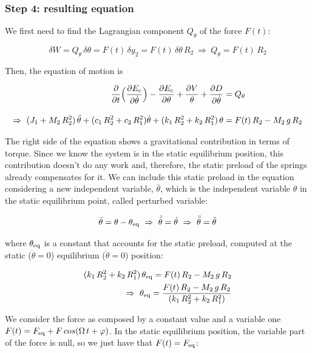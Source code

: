 \documentclass[a4paper,12pt,oneside]{article}
\begin{document}
\subsubsection*{Step 4: resulting equation}

We first need to find the Lagrangian component $ Q_\theta $ of the force $ F(t) $:

\[
	\delta W = Q_\theta \, \delta \theta =
		F(t) \, \delta y_2 = F(t) \, \delta \theta \, R_2 ~ \Rightarrow ~
		Q_\theta = F(t) \, R_2
\]

Then, the equation of motion is

\[ \begin{split}
	\frac{\partial}{\partial t}
		\Bigl(\frac{\partial E_c}{\partial \dot{\theta}}\Bigr) -
		\frac{\partial E_c}{\partial \theta} +
		\frac{\partial V}{\theta} +
		\frac{\partial D}{\partial \dot{\theta}} & = Q_\theta \\[10pt]
	\Rightarrow ~ (J_1 + M_2 \, R_2^2) \,	\ddot{\theta} +
		(c_1 \, R_2^2 + c_2 \, R_1^2)	\dot{\theta} +
		(k_1 \, R_2^2 + k_2 \, R_1^2) \, \theta & = F(t) \, R_2 - M_2 \, g \, R_2
\end{split} \]

The right side of the equation shows a gravitational contribution in terms of torque. Since we know the system is in the static equilibrium position, this contribution doesn't do any work and, therefore, the static preload of the springs already compensates for it. We can include this static preload in the equation considering a new independent variable, $ \bar{\theta} $, which is the independent variable $ \theta $ in the static equilibrium point, called perturbed variable:

\[
	\bar{\theta} = \theta - \theta_\textup{eq} ~ \Rightarrow ~
		\dot{\bar{\theta}} = \dot{\theta} ~ \Rightarrow ~
		\ddot{\bar{\theta}} = \ddot{\theta}
\]

where $ \theta_\textup{eq} $ is a constant that accounts for the static preload, computed at the static ($ \dot{\theta} = 0 $) equilibrium ($ \ddot{\theta} = 0 $) position:

\[ \begin{split}
	(k_1 \, R_2^2 + k_2 \, R_1^2) \, \theta_\textup{eq} =
		F(t) \, R_2 - M_2 \, g \, R_2 \\
	\Rightarrow ~ \theta_\textup{eq} =
		\frac{F(t) \, R_2 - M_2 \, g \, R_2}{(k_1 \, R_2^2 + k_2 \, R_1^2)}
\end{split} \]

We consider the force as composed by a constant value and a variable one $ F(t) = F_\textup{eq} + F \, cos(\Omega \, t + \varphi) $. In the static equilibrium position, the variable part of the force is null, so we just have that $ F(t) = F_\textup{eq} $:
\end{document}
